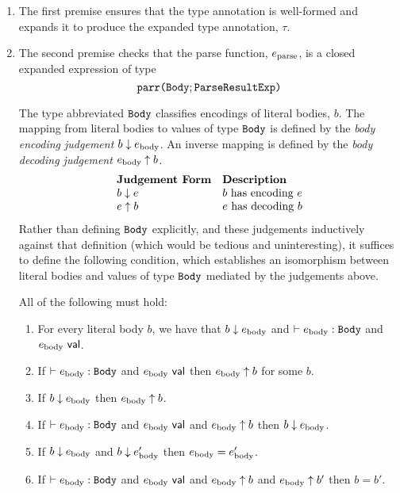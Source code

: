 \begin{enumerate}
\item The first premise ensures that the type annotation is well-formed and expands it to produce the expanded type annotation, $\tau$.

\item The second premise checks that the parse function, $e_\text{parse}$, is a closed expanded expression of type \[\texttt{parr}\texttt{(}\mathtt{Body}; \mathtt{ParseResultExp}\texttt{)}\] %

The type abbreviated $\mathtt{Body}$ classifies encodings of literal bodies, $b$. The mapping from literal bodies to values of type $\mathtt{Body}$ is defined by the \emph{body encoding judgement} $b \downarrow e_\text{body}$. An inverse mapping is defined   by the \emph{body decoding judgement} $e_\text{body} \uparrow b$.
\[\begin{array}{ll}
\textbf{Judgement Form} & \textbf{Description}\\
b \downarrow e & \text{$b$ has encoding $e$}\\
e \uparrow b & \text{$e$ has decoding $b$}
\end{array}\]
Rather than defining $\mathtt{Body}$ explicitly, and these judgements inductively against that definition (which would be tedious and uninteresting), it suffices to define the following condition, which establishes an isomorphism between literal bodies and values of type $\mathtt{Body}$ mediated by the judgements above.
\begin{condition} All of the following must hold:
\begin{enumerate}
\item For every literal body $b$, we have that $b \downarrow e_\text{body}$ and $\vdash e_\text{body} : \mathtt{Body}$ and $e_\text{body}~\mathsf{val}$.
\item If $\vdash e_\text{body} : \mathtt{Body}$ and $e_\text{body}~\mathsf{val}$ then $e_\text{body} \uparrow b$ for some $b$.
\item If $b \downarrow e_\text{body}$ then $e_\text{body} \uparrow b$.
\item If $\vdash e_\text{body} : \mathtt{Body}$ and $e_\text{body}~\mathsf{val}$ and $e_\text{body} \uparrow b$ then $b \downarrow e_\text{body}$. 
\item If $b \downarrow e_\text{body}$ and $b \downarrow e_\text{body}'$ then $e_\text{body} = e_\text{body}'$.
\item If $\vdash e_\text{body} : \mathtt{Body}$ and $e_\text{body}~\mathsf{val}$ and $e_\text{body} \uparrow b$ and $e_\text{body} \uparrow b'$ then $b=b'$.
\end{enumerate}
\end{condition}


\end{enumerate}
